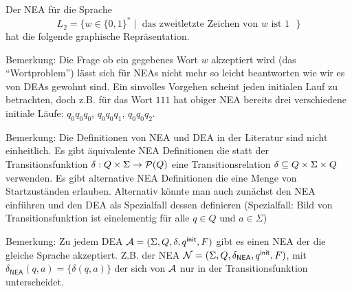 \begin{Bsp}
\label{bsp:2.zweitletztes} Der NEA für die Sprache 
$$L_2=\{w\in\{0,1\}^*\mid \text{ das zweitletzte Zeichen von $w$ ist $1$ }\}$$ hat die folgende graphische Repräsentation.
  \begin{center}
  \end{center}
\end{Bsp}


Bemerkung: Die Frage ob ein gegebenes Wort $w$ akzeptiert wird (das ``Wortproblem'') lässt sich für NEAs nicht mehr so leicht beantworten wie wir es von DEAs gewohnt sind.
Ein sinvolles Vorgehen scheint jeden initialen Lauf zu betrachten, doch z.B. für das Wort $111$ hat obiger NEA bereits  drei verschiedene initiale Läufe: $q_0q_0q_0$, $q_0q_0q_1$, $q_0q_0q_2$.


Bemerkung: Die Definitionen von \ac{NEA} und \ac{DEA} in der Literatur sind nicht einheitlich. 
Es gibt äquivalente \ac{NEA} Definitionen die statt der Transitionsfunktion $\delta:Q\x\Sigma\->\mathcal{P}(Q)$ eine Transitionsrelation $\delta\subseteq Q\times\Sigma\times Q$ verwenden.
Es gibt alternative \ac{NEA} Definitionen die eine Menge von Startzuständen erlauben.
Alternativ könnte man auch zunächst den \ac{NEA} einführen und den \ac{DEA} als Spezialfall dessen definieren (Spezialfall: Bild von Transitionsfunktion ist einelementig für alle $q\in Q$ und $a\in\Sigma$)

Bemerkung: Zu jedem \ac{DEA} $\mathcal{A}= (\Sigma, Q,\delta,{q^\mathsf{init}},F)$ gibt es einen \ac{NEA} der die gleiche Sprache akzeptiert.
Z.B. der \ac{NEA} $\mathcal{N}= (\Sigma, Q,\delta_\mathsf{NEA},{q^\mathsf{init}},F)$, mit $\delta_\mathsf{NEA}(q,a)=\{\delta(q,a)\}$ der sich von $\mathcal{A}$ nur in der Transitionsfunktion unterscheidet.


